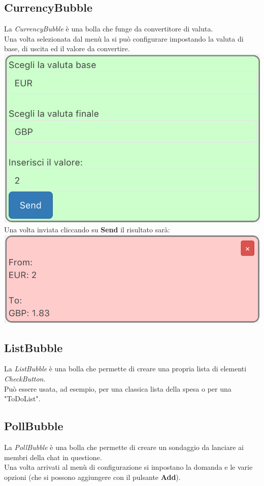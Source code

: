 \subsection{CurrencyBubble}
La \textit{CurrencyBubble} è una bolla che funge da convertitore di valuta.
\\Una volta selezionata dal menù la si può configurare impostando la valuta di base, di uscita ed il valore da convertire.\\

\includegraphics[scale=0.75]{img/currConfig.png}
\\
Una volta inviata cliccando su \textbf{Send} il risultato sarà:\\

\includegraphics[scale=0.75]{img/curr.png}
\subsection{ListBubble}
La \textit{ListBubble} è una bolla che permette di creare una propria lista di elementi \textit{CheckButton}. \\
Può essere usata, ad esempio, per una classica lista della spesa o per una "ToDoList".

\subsection{PollBubble}
La \textit{PollBubble} è una bolla che permette di creare un sondaggio da lanciare ai membri della chat in questione.\\
Una volta arrivati al menù di configurazione si impostano la domanda e le varie opzioni (che si possono aggiungere con il pulsante \textbf{Add}).
\\

